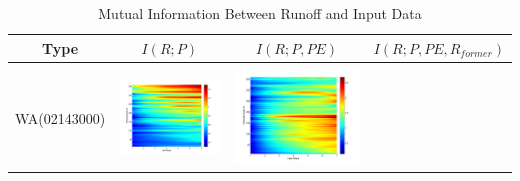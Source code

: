 \documentclass[11pt]{article}
\begin{document}
\begin{table}[H]\small 
\caption{Mutual Information Between Runoff and Input Data}
\label{MI}
\resizebox{\textwidth}{!}
{
\centering
\begin{tabular}{cccc}
\toprule
Type&$I(R;P)$&$I(R;P,PE)$&$I(R;P,PE,R_{former})$\\\hline
\\
WA(02143000)
&\begin{minipage}{.3\textwidth}\includegraphics[width=\linewidth]{resultgraph/02143000p.png}\end{minipage}
&\begin{minipage}{.3\textwidth}\includegraphics[width=\linewidth]{resultgraph/02143000pep.png}\end{minipage}

\end{tabular}}
\end{table}
\end{document}
